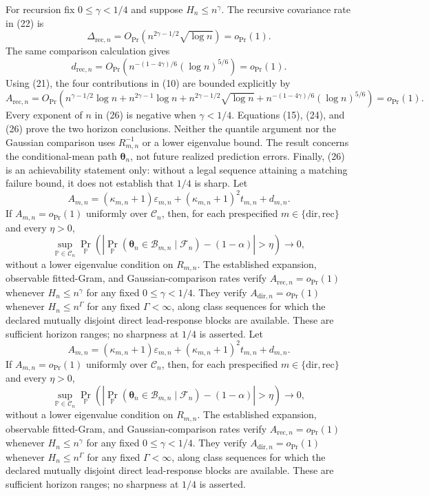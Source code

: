 For recursion fix \(0\le\gamma<1/4\) and suppose \(H_n\le n^\gamma\).  The recursive covariance rate in (22) is
\[
 \Delta_{\mathrm{rec},n}
 =O_{\Pr}\!\left(n^{2\gamma-1/2}\sqrt{\log n}\right)=o_{\Pr}(1).
\]
The same comparison calculation gives
\[
 d_{\mathrm{rec},n}
 =O_{\Pr}\!\left(
 n^{-(1-4\gamma)/6}(\log n)^{5/6}\right)=o_{\Pr}(1).              \tag{25}
\]
Using (21), the four contributions in (10) are bounded explicitly by
\[
 A_{\mathrm{rec},n}
 =O_{\Pr}\!\left(
 n^{\gamma-1/2}\log n
 +n^{2\gamma-1}\log n
 +n^{2\gamma-1/2}\sqrt{\log n}
 +n^{-(1-4\gamma)/6}(\log n)^{5/6}
 \right)=o_{\Pr}(1).                                                \tag{26}
\]
Every exponent of \(n\) in (26) is negative when \(\gamma<1/4\).  Equations (15), (24), and (26) prove the two horizon conclusions.  Neither the quantile argument nor the Gaussian comparison uses \(R_{m,n}^{-1}\) or a lower eigenvalue bound.  The result concerns the conditional-mean path \(\boldsymbol\theta_n\), not future realized prediction errors.  Finally, (26) is an achievability statement only: without a legal sequence attaining a matching failure bound, it does not establish that \(1/4\) is sharp.
Let
\[
 A_{m,n}=(\kappa_{m,n}+1)\varepsilon_{m,n}
 +(\kappa_{m,n}+1)^2t_{m,n}+d_{m,n}.
\]
If \(A_{m,n}=o_{\Pr}(1)\) uniformly over \(\mathcal C_n\), then, for each prespecified \(m\in\{\mathrm{dir},\mathrm{rec}\}\) and every \(\eta>0\),
\[
 \sup_{\mathbb P\in\mathcal C_n}
 \Pr_{\mathbb P}\!\left(
 \left|\Pr_{\mathbb P}(\boldsymbol\theta_n\in\mathcal B_{m,n}
 \mid\mathcal F_n)-(1-\alpha)\right|>\eta\right)\longrightarrow0,
\]
without a lower eigenvalue condition on \(R_{m,n}\).  The established expansion, observable fitted-Gram, and Gaussian-comparison rates verify \(A_{\mathrm{rec},n}=o_{\Pr}(1)\) whenever \(H_n\le n^\gamma\) for any fixed \(0\le\gamma<1/4\).  They verify \(A_{\mathrm{dir},n}=o_{\Pr}(1)\) whenever \(H_n\le n^\Gamma\) for any fixed \(\Gamma<\infty\), along class sequences for which the declared mutually disjoint direct lead-response blocks are available.  These are sufficient horizon ranges; no sharpness at \(1/4\) is asserted.
Let
\[
 A_{m,n}=(\kappa_{m,n}+1)\varepsilon_{m,n}
 +(\kappa_{m,n}+1)^2t_{m,n}+d_{m,n}.
\]
If \(A_{m,n}=o_{\Pr}(1)\) uniformly over \(\mathcal C_n\), then, for each prespecified \(m\in\{\mathrm{dir},\mathrm{rec}\}\) and every \(\eta>0\),
\[
 \sup_{\mathbb P\in\mathcal C_n}
 \Pr_{\mathbb P}\!\left(
 \left|\Pr_{\mathbb P}(\boldsymbol\theta_n\in\mathcal B_{m,n}
 \mid\mathcal F_n)-(1-\alpha)\right|>\eta\right)\longrightarrow0,
\]
without a lower eigenvalue condition on \(R_{m,n}\).  The established expansion, observable fitted-Gram, and Gaussian-comparison rates verify \(A_{\mathrm{rec},n}=o_{\Pr}(1)\) whenever \(H_n\le n^\gamma\) for any fixed \(0\le\gamma<1/4\).  They verify \(A_{\mathrm{dir},n}=o_{\Pr}(1)\) whenever \(H_n\le n^\Gamma\) for any fixed \(\Gamma<\infty\), along class sequences for which the declared mutually disjoint direct lead-response blocks are available.  These are sufficient horizon ranges; no sharpness at \(1/4\) is asserted.
